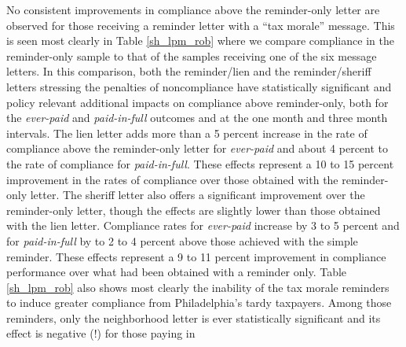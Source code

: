 \documentclass[12pt]{article}
\begin{document}
No consistent improvements in compliance above the reminder-only
letter are observed for those receiving a reminder letter with a ``tax
morale'' message.  This is seen most clearly in Table \ref{sh_lpm_rob}
where we compare compliance in the reminder-only sample to that of the
samples receiving one of the six message letters. In this comparison,
both the reminder/lien and the reminder/sheriff letters stressing the
penalties of noncompliance have statistically significant and policy
relevant additional impacts on compliance above reminder-only, both
for the \textit{ever-paid} and \textit{paid-in-full} outcomes and at
the one month and three month intervals. The lien letter adds more
than a 5 percent increase in the rate of compliance above the
reminder-only letter for \textit{ever-paid} and about 4 percent to the
rate of compliance for \textit{paid-in-full}. These effects represent
a 10 to 15 percent improvement in the rates of compliance over those
obtained with the reminder-only letter.  The sheriff letter also
offers a significant improvement over the reminder-only letter, though
the effects are slightly lower than those obtained with the lien
letter.  Compliance rates for \textit{ever-paid} increase by 3 to 5
percent and for \textit{paid-in-full} by to 2 to 4 percent above those
achieved with the simple reminder.  These effects represent a 9 to 11
percent improvement in compliance performance over what had been
obtained with a reminder only. Table \ref{sh_lpm_rob} also shows most
clearly the inability of the tax morale reminders to induce greater
compliance from Philadelphia's tardy taxpayers.  Among those
reminders, only the neighborhood letter is ever statistically
significant and its effect is negative (!) for those paying in
\end{document}
